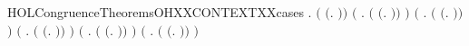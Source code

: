 \begin{SaveVerbatim}{HOLCongruenceTheoremsOHXXCONTEXTXXcases}
\HOLTokenTurnstile{} \HOLSymConst{\HOLTokenForall{}}.
         \HOLSymConst{\HOLTokenEquiv{}}
       \ensuremath{(} \HOLSymConst{\ensuremath{=}} \ensuremath{(}\HOLTokenLambda{}. \ensuremath{)}\ensuremath{)} \HOLSymConst{\HOLTokenDisj{}}
       \ensuremath{(}\HOLSymConst{\HOLTokenExists{}} . \ensuremath{(} \HOLSymConst{\ensuremath{=}} \ensuremath{(}\HOLTokenLambda{}. \HOLSymConst{\ensuremath{\ldotp}} \ensuremath{)}\ensuremath{)} \HOLSymConst{\HOLTokenConj{}}  \ensuremath{)} \HOLSymConst{\HOLTokenDisj{}}
       \ensuremath{(}\HOLSymConst{\HOLTokenExists{}} . \ensuremath{(} \HOLSymConst{\ensuremath{=}} \ensuremath{(}\HOLTokenLambda{}.   \HOLSymConst{\ensuremath{+}} \ensuremath{)}\ensuremath{)} \HOLSymConst{\HOLTokenConj{}}  \ensuremath{)} \HOLSymConst{\HOLTokenDisj{}}
       \ensuremath{(}\HOLSymConst{\HOLTokenExists{}} . \ensuremath{(} \HOLSymConst{\ensuremath{=}} \ensuremath{(}\HOLTokenLambda{}.  \HOLSymConst{\ensuremath{+}}  \ensuremath{)}\ensuremath{)} \HOLSymConst{\HOLTokenConj{}}  \ensuremath{)} \HOLSymConst{\HOLTokenDisj{}}
       \ensuremath{(}\HOLSymConst{\HOLTokenExists{}} . \ensuremath{(} \HOLSymConst{\ensuremath{=}} \ensuremath{(}\HOLTokenLambda{}.   \HOLSymConst{\ensuremath{\mid}} \ensuremath{)}\ensuremath{)} \HOLSymConst{\HOLTokenConj{}}  \ensuremath{)} \HOLSymConst{\HOLTokenDisj{}}
       \ensuremath{(}\HOLSymConst{\HOLTokenExists{}} . \ensuremath{(} \HOLSymConst{\ensuremath{=}} \ensuremath{(}\HOLTokenLambda{}.  \HOLSymConst{\ensuremath{\mid}}  \ensuremath{)}\ensuremath{)} \HOLSymConst{\HOLTokenConj{}}  \ensuremath{)} \HOLSymConst{\HOLTokenDisj{}}

\end{SaveVerbatim}
